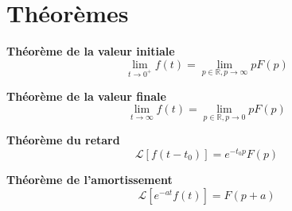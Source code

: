 \section{Théorèmes}
\begin{multicols}{2}
\begin{theorem} \textbf{\textsf{Théorème de la valeur initiale }}~\\
$$ \lim\limits_{t \to 0^+} f(t) = \lim\limits_{p\in\mathbb{R}, p \to \infty} pF(p)$$
\end{theorem} 

\begin{theorem} \textbf{\textsf{Théorème de la valeur finale}} ~\\
$$\lim\limits_{t \to \infty} f(t) = \lim\limits_{p\in\mathbb{R}, p \to 0} pF(p)$$
\end{theorem} 

\begin{theorem} \textbf{\textsf{Théorème du retard}} ~\\
$$\mathcal{L}\left[ f\left(t-t_0\right) \right] = e^{-t_0 p}F(p)$$
\end{theorem} 

\begin{theorem} \textbf{\textsf{Théorème de l'amortissement}} ~\\
$$\mathcal{L} \left[ e^{-a t} f\left(t\right) \right] = F(p+a)$$
\end{theorem} 
\end{multicols}


%
%
%


